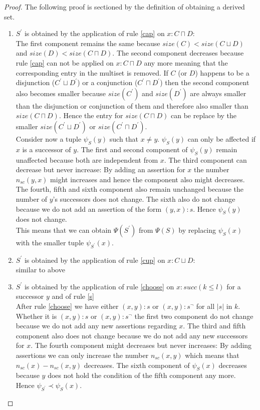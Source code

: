 \documentclass[a4paper,11pt]{scrartcl}
\theoremstyle{break}
\theoremstyle{definition}
\begin{document}
\begin{proof}
The following proof is sectioned by the definition of obtaining a derived set.
\begin{enumerate}
\item $S^\prime$ is obtained by the application of rule \ref{cap} on $x:C\sqcap D$:\\
The first component remains the same because $size(C)<size(C\sqcup D)$ and $size(D)<size(C\sqcap D)$. The second component decreases because rule \ref{cap} can not be applied on $x:C\sqcap D$ any more meaning that the corresponding entry in the multiset is removed. If $C$ (or $D$) happens to be a disjunction ($C^\prime\sqcup D^\prime$) or a conjunction ($C^\prime\sqcap D^\prime$) then the second component also becomes smaller because $size(C^\prime)$ and $size(D^\prime)$ are always smaller than the disjunction or conjunction of them and therefore also smaller than $size(C\sqcap D)$. Hence the entry for $size(C\sqcap D)$ can be replace by the smaller $size(C^\prime\sqcup D^\prime)$ or $size(C^\prime\sqcap D^\prime)$.\\
Consider now a tuple $\psi_S(y)$ such that $x\neq y$. $\psi_S(y)$ can only be affected if $x$ is a successor of $y$. The first and second component of $\psi_S(y)$ remain unaffected because both are independent from $x$. The third component can decrease but never increase: By adding an assertion for $x$ the number $n_{sc}(y,x)$ might increases and hence the component also might decreases. The fourth, fifth and sixth component also remain unchanged because the number of $y$'s successors does not change. The sixth also do not change because we do not add an assertion of the form $(y,x):s$. Hence $\psi_S(y)$ does not change.\\
This means that we can obtain $\Psi(S^\prime)$ from $\Psi(S)$ by replacing $\psi_S(x)$ with the smaller tuple $\psi_{S^\prime}(x)$. 
\item $S^\prime$ is obtained by the application of rule \ref{cup} on $x:C\sqcup D$:\\
similar to above
\item $S^\prime$ is obtained by the application of rule \ref{choose} on $x:succ(k\leq l)$ for a successor $y$ and of rule \ref{s}\\
After rule \ref{choose} we have either $(x,y):s$ or $(x,y):s^\neg$ for all $|s|$ in $k$. Whether it is $(x,y):s$ or $(x,y):s^\neg$ the first two component do not change because we do not add any new assertions regarding $x$. The third and fifth component also does not change because we do not add any new successors for $x$. The fourth component might decreases but never increases: By adding assertions we can only increase the number $n_{sc}(x,y)$ which means that $n_{sc}(x)-n_{sc}(x,y)$ decreases. The sixth component of $\psi_S(x)$ decreases because $y$ does not hold the condition of the fifth component any more.  Hence $\psi_{S^\prime}\prec\psi_S(x)$.\\ 

\end{enumerate}
\end{proof}
\end{document}
